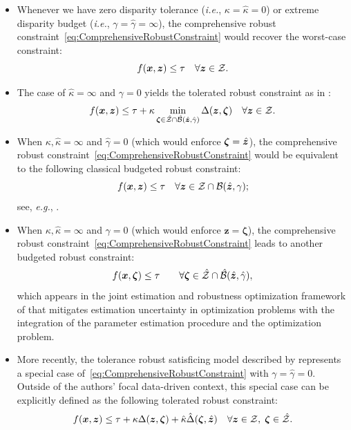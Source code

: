\documentclass[mnsc, nonblindrev]{informswp}
\newcommand{\1}[1]{\mathds{1}{\left(#1\right)}}
\begin{document}
\begin{itemize}
\item Whenever we have zero disparity tolerance (\textit{i.e.}, $\kappa = \hat \kappa = 0$) or extreme disparity budget (\textit{i.e.}, $\gamma = \hat \gamma =\infty$),  the comprehensive robust constraint~\eqref{eq:ComprehensiveRobustConstraint} would recover the worst-case constraint:
\[
f(\bm x,\bm z) \leq \tau ~~~\forall \bm z \in \mathcal{Z}.
\]

\item The case of $\hat \kappa = \infty$ and $\gamma = 0$ yields the tolerated robust constraint as in \cite{BenTal_et_al_2017globalized}:
$$
f({\bm x},{\bm z}) \leq \tau + \kappa  \min_{\bm \zeta \in \hat {\mathcal{Z}} \cap \hat {\mathcal{B}}(\hat{\bm{z}}, \hat \gamma)} \Delta(\bm z,\bm \zeta)  ~~~\forall \bm z \in \mathcal{Z}.
$$

\item When $\kappa, \hat \kappa = \infty$ and $\hat \gamma=0$ (which would enforce $\bm \zeta = \hat{\bm{z}}$), the comprehensive robust constraint~\eqref{eq:ComprehensiveRobustConstraint} would be equivalent to the following classical budgeted robust constraint:
$$
f({\bm x},{\bm z}) \leq \tau ~~~\forall \bm z \in \mathcal{Z} \cap \mathcal{B}(\hat{\bm{z}}, \gamma);
$$ 
see, \textit{e.g.}, \cite{bertsimas2004price}.

\item When $\kappa, \hat \kappa = \infty$ and $\gamma = 0$ (which would enforce $\bm z = \bm \zeta$), the comprehensive robust constraint~\eqref{eq:ComprehensiveRobustConstraint} leads to another budgeted robust constraint:
$$
f({\bm x},{\bm \zeta}) \leq \tau \quad \quad \forall \bm \zeta \in \hat {\mathcal{Z}}\cap \hat {\mathcal{B}}(\hat{\bm{z}}, \hat \gamma),
$$
which appears in the joint estimation and robustness optimization framework of \cite{Zhu_Xie_Sim_2021joint} that mitigates estimation uncertainty in optimization problems with the integration of the parameter estimation procedure and the optimization problem.

\item More recently, the tolerance robust satisficing model described by \cite{sim2024analytics} represents a special case of~\eqref{eq:ComprehensiveRobustConstraint} with $\gamma = \hat \gamma = 0$. Outside of the authors' focal data-driven context, this special case can be explicitly defined as the following tolerated robust constraint:
$$
f(\bm x,\bm z) \leq \tau + \kappa \Delta(\bm z,\bm \zeta) + \hat \kappa \hat \Delta(\bm \zeta,\hat{\bm{z}}) ~~~\forall \bm z \in \mathcal{Z} , \; \bm \zeta \in \hat {\mathcal{Z}}.
$$
\end{itemize}
\end{document}

